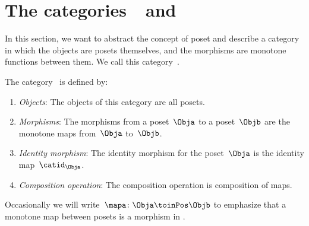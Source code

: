
\section[The categories \Pos and \Lat]{The categories~\Pos~and~\Lat}
\label{sec:category-Pos}
In this section, we want to abstract the concept of poset and describe a category in which the objects are posets themselves, and the morphisms are monotone functions between them.
We call this category~\Pos.

\begin{ctdefinition}
    \label{def:Pos}
    The category~\iindex{\Pos} is defined by:
    \begin{enumerate}
        \item \emph{Objects}: The objects of this category are all posets.
        \item \emph{Morphisms}: The morphisms from a poset~$\Obja$ to a poset~$\Objb$ are the monotone maps from~$\Obja$ to~$\Objb$.
        \item \emph{Identity morphism}: The identity morphism for the poset~$\Obja$
              is the identity map~$\catid_\Obja$.
        \item \emph{Composition operation}: The composition operation is composition of maps.
    \end{enumerate}
\end{ctdefinition}

Occasionally we will write~$\mapa \colon \Obja \toinPos \Objb$ to emphasize that a monotone map between posets is a morphism in \Pos.

